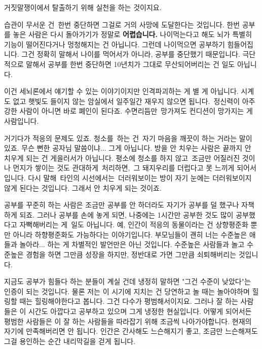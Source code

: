 거짓말쟁이에서 탈출하기 위해 실천을 하는 것이지요.
\vspace{5mm}

습관이 무서운 건 한번 중단하면 그걸로 거의 사망에 도달한다는 것입니다.
한번 공부를 놓은 사람은 다시 돌아가기가 정말로 \textbf{어렵습니다.}
나이먹는다고 해도 뇌가 특별히 기능이 떨어진다거나 멍청해지는 건 아닙니다. 그런데 나이먹으면 공부하기 힘들어집니다.
그건 정확히 말해서 나이를 먹어서가 아니라, 공부를 중단했기 때문입니다.
극단적으로 말해서 공부를 한번 중단하면 10년치가 그대로 무산되어버리는 건 일도 아닙니다.
\vspace{5mm}

이건 세뇌론에서 얘기할 수 있는 이야기이지만 인격파괴하는 게 별 게 아닙니다.
시계도 없고 햇빛도 들이지 않는 암실에서 일주일간 재우지 않으면 됩니다. 정신력이 아주 강한 사람이 아니면 바로 폐인이 된다죠.
수면리듬만 망가져도 컨디션이 망가지는 게 사람입니다.
\vspace{5mm}

거기다가 적응의 문제도 있죠. 청소를 하는 건 자기 마음을 깨끗이 하는 거라는 말이 있죠.
무슨 뻔한 공자님 말씀이냐... 그게 아닙니다. 방을 안 치우는 사람은 끝까지 안 치우게 되는 건 게을러서가 아닙니다.
평소에 청소를 하지 않고 조금만 어질러진 것이나 먼지가 쌓이는 것도 관대하게 처리하면, 그 돼지우리를 더럽다고 못 느끼게 되어서입니다.
다시 말해 타인의 시선에서는 더러워보이는 방이 자기 눈에는 더러워보이지 않게 된다는 것입니다. 그래서 안 치우게 되는 것이죠.
\vspace{5mm}

공부를 꾸준히 하는 사람은 조금만 공부를 안 하더라도 자기가 공부를 덜 했구나 자책하게 되죠.
그러나 공부를 손에 놓게 되면, 나중에는 1시간만 공부한 것도 많이 공부했다고 자뻑해버리는 게 일도 아닙니다.
예, 인간이 적응의 동물이라는 건 상향평준화 뿐만 아니라 하향평준화도 가능하다는 이야기입니다.
부모님들이 괜히 너는 수준높은 애들과 놀아라... 하는 게 차별적인 발언만은 아닌 것입니다.
수준높은 사람들과 놀고 수준높은 경험을 하면 그만큼 성장을 하지만, 정반대로 가면 그만큼 쇠퇴해버리는 것입니다.
\vspace{5mm}

지금도 공부가 힘들다 하는 분들이 계실 건데 냉정히 말하면 "그건 수준이 낮았다"는 인증이 되는 것입니다.
물론 저는 이 시기에 지치는 건 당연하고 놀 때는 놀아야하며 힐링할 때는 힐링해야한다고 봅니다. 그건 다수가 평범해서이지요.
그러나 잘 하는 사람들은 이 시간도 아깝다고 공부하고 있으며 그게 냉정한 현실입니다.
어떻게 되어서든 평범한 사람들은 이 잘 하는 사람들을 따라잡기 위해 조금씩 나아가야합니다.
현재의 자기에 만족해버리면 안 됩니다. 인간은 간사해도 느슨해지기 좋고, 조금만 느슨해져도 그걸 용인하는 순간 내리막길을 걷게 됩니다.
\vspace{5mm}

